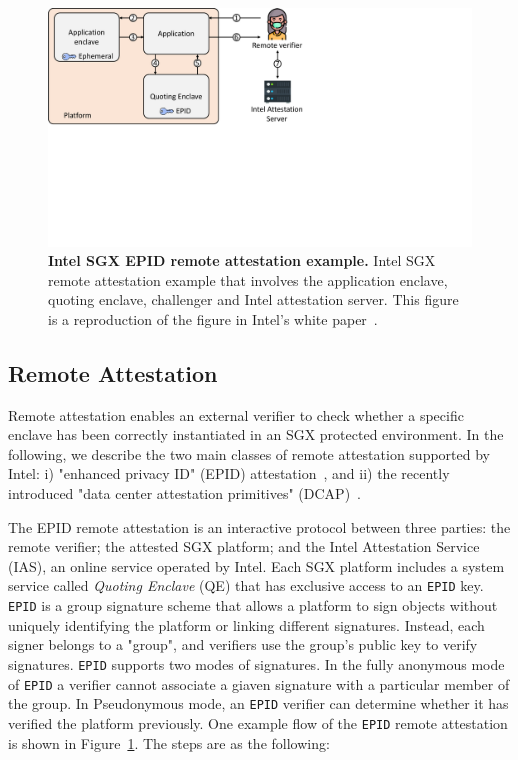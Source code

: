




\begin{figure}[t]
  \centering
    \includegraphics[trim={0 9cm 12cm 0},clip,width=0.9\linewidth]{chapters/background/figures/remote_attestation.pdf}
    \caption[Intel SGX EPID remote attestation example]{\textbf{Intel SGX EPID remote attestation example.} Intel SGX remote attestation example that involves the application enclave, quoting enclave, challenger and Intel attestation server. This figure is a reproduction of the figure in Intel's white paper~\cite{attestation_primitive_all}.}
    \label{fig:ra_bg}
\end{figure}

\subsection{Remote Attestation}
\label{ch:background:SGX:remote}

Remote attestation enables an external verifier to check whether a specific enclave has been correctly instantiated in an SGX protected environment. In the following, we describe the two main classes of remote attestation supported by Intel: i) "enhanced privacy ID" (EPID) attestation~\cite{epid_attestation}, and ii) the recently introduced "data center attestation primitives" (DCAP)~\cite{DCAP}. 


The EPID remote attestation is an interactive protocol between three parties: the remote verifier; the attested SGX platform; and the Intel Attestation Service (IAS), an online service operated by Intel. Each SGX platform includes a system service called \emph{Quoting Enclave} (QE) that has exclusive access to an \texttt{EPID} key. \texttt{EPID} is a group signature scheme that allows a platform to sign objects without uniquely identifying the platform or linking different signatures. Instead, each signer belongs to a "group", and verifiers use the group's public key to verify signatures. \texttt{EPID} supports two modes of signatures. In the fully anonymous mode of \texttt{EPID} a verifier cannot associate a giaven signature with a particular member of the group. In Pseudonymous mode, an \texttt{EPID} verifier can determine whether it has verified the platform previously.
One example flow of the \texttt{EPID} remote attestation is shown in Figure~\ref{fig:ra_bg}. The steps are as the following:


